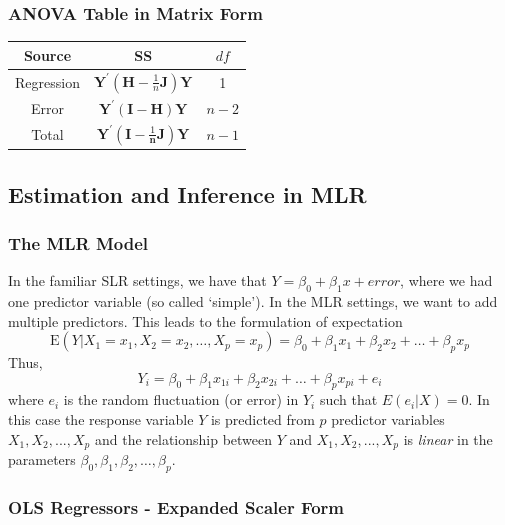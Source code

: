 \documentclass[10pt]{article}
\begin{document}
\subsubsection{ANOVA Table in Matrix Form}
\begin{center}
    \begin{tabular}{|c||c|c|}
        \hline
        Source & SS & $df$ \\ \hline
        Regression & $\mathbf{Y}^{\prime}\left(\mathbf{H}-\frac{1}{n} \mathbf{J}\right) \mathbf{Y}$ & 1 \\ \hline
        Error & $\mathbf{Y}^{\prime}(\mathbf{I}-\mathbf{H}) \mathbf{Y}$ & $n-2$ \\ \hline
        Total & $\mathbf{Y}^{\prime}\left(\mathbf{I}-\frac{1}{\mathbf{n}} \mathbf{J}\right) \mathbf{Y}$ & $n-1$ \\ \hline
    \end{tabular}
\end{center}


\subsection{Estimation and Inference in MLR}
\subsubsection{The MLR Model} In the familiar SLR settings, we have that $Y = \beta_0 + \beta_1 x + error$, where we had one predictor variable (so called `simple'). In the MLR settings, we want to add multiple predictors. This leads to the formulation of expectation
\begin{equation*}
    \mathrm{E}\left(Y | X_{1}=x_{1}, X_{2}=x_{2}, \ldots, X_{p}=x_{p}\right)=\beta_{0}+\beta_{1} x_{1}+\beta_{2} x_{2}+\ldots+\beta_{p} x_{p}
\end{equation*}
Thus,
\begin{equation*}
    Y_{i}=\beta_{0}+\beta_{1} x_{1 i}+\beta_{2} x_{2 i}+\ldots+\beta_{p} x_{p i}+e_{i}
\end{equation*}
where $e_i$ is the random fluctuation (or error) in $Y_i$ such that $E(e_i |X) = 0$. In this case the response variable $Y$ is predicted from $p$ predictor variables $X_1,X_2,...,X_p$ and \color{BurntOrange} the relationship between $Y$ and $X_1,X_2,...,X_p$ is \textit{linear} in the parameters $\beta_{0}, \beta_{1}, \beta_{2}, \ldots, \beta_{p}$.  \color{Black}
\subsubsection{OLS Regressors - Expanded Scaler Form}
\end{document}
